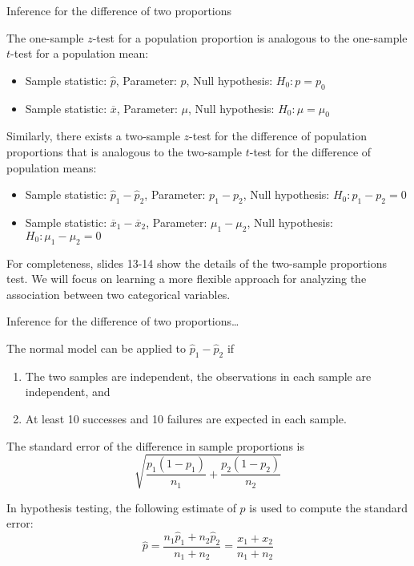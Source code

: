 \documentclass[
  ignorenonframetext,
  aspectratio=169]{beamer}
\providecommand{\tightlist}{%
  \setlength{\itemsep}{0pt}\setlength{\parskip}{0pt}}
\begin{document}
\begin{frame}{Inference for the difference of two proportions}
\protect\hypertarget{inference-for-the-difference-of-two-proportions}{}
\small

The one-sample \(z\)-test for a population proportion is analogous to
the one-sample \(t\)-test for a population mean:

\begin{itemize}
\tightlist
\item
  Sample statistic: \(\hat{p}\), Parameter: \(p\), Null hypothesis:
  \(H_0: p = p_0\)
\item
  Sample statistic: \(\overline{x}\), Parameter: \(\mu\), Null
  hypothesis: \(H_0: \mu = \mu_0\)
\end{itemize}

Similarly, there exists a two-sample \(z\)-test for the difference of
population proportions that is analogous to the two-sample \(t\)-test
for the difference of population means:

\begin{itemize}
\tightlist
\item
  Sample statistic: \(\hat{p}_1 - \hat{p}_2\), Parameter: \(p_1 - p_2\),
  Null hypothesis: \(H_0: p_1 - p_2 = 0\)
\item
  Sample statistic: \(\overline{x}_1 - \overline{x}_2\), Parameter:
  \(\mu_1 - \mu_2\), Null hypothesis: \(H_0: \mu_1 - \mu_2 = 0\)
\end{itemize}

For completeness, slides 13-14 show the details of the two-sample
proportions test. We will focus on learning a more flexible approach for
analyzing the association between two categorical variables.
\end{frame}

\begin{frame}{Inference for the difference of two proportions\ldots{}}
\protect\hypertarget{inference-for-the-difference-of-two-proportions-1}{}
\small

The normal model can be applied to \(\hat{p}_1 - \hat{p}_2\) if

\begin{enumerate}
\item
  The two samples are independent, the observations in each sample are
  independent, and
\item
  At least 10 successes and 10 failures are expected in each sample.
\end{enumerate}

The standard error of the difference in sample proportions is
\[\sqrt{\dfrac{p_1(1 - p_1)}{n_1} + \dfrac{p_2(1 - p_2)}{n_2}} \]

In hypothesis testing, the following estimate of \(p\) is used to
compute the standard error:
\[\hat{p} = \dfrac{n_1\hat{p}_1 + n_2\hat{p}_2}{n_1 + n_2} = \dfrac{x_1 + x_2}{n_1 + n_2} \]
\end{frame}
\end{document}
